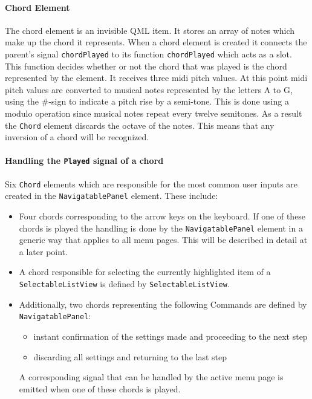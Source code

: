 \paragraph{Chord Element} The chord element is an invisible QML item. It stores an array of notes which make up the chord it represents. When a chord element is created it connects the parent's signal {\tt chordPlayed} to its function {\tt chordPlayed} which acts as a slot. This function decides whether or not the chord that was played is the chord represented by the element. It receives three midi pitch values. At this point midi pitch values are converted to musical notes represented by the letters A to G, using the \#-sign to indicate a pitch rise by a semi-tone. This is done using a modulo operation since musical notes repeat every twelve semitones. As a result the {\tt Chord} element discards the octave of the notes. This means that any inversion of a chord will be recognized.
\paragraph{Handling the {\tt Played} signal of a chord}
Six {\tt Chord} elements which are responsible for the most common user inputs are created in the {\tt NavigatablePanel} element. These include:
\begin {itemize}
	\item {Four chords corresponding to the arrow keys on the keyboard. If one of these chords is played the handling is done by the {\tt NavigatablePanel} element in a generic way that applies to all menu pages. This will be described in detail at a later point.}
	\item {A chord responsible for selecting the currently highlighted item of a {\tt SelectableListView} is defined by {\tt SelectableListView}}.
	\item {Additionally, two chords representing the following Commands are defined by {\tt NavigatablePanel}: 
		\begin {itemize}
			\item {instant confirmation of the settings made and proceeding to the next step}
			\item {discarding all settings and returning to the last step}
		\end {itemize} 
	A corresponding signal that can be handled by the active menu page is emitted when one of these chords is played.}
\end {itemize}

